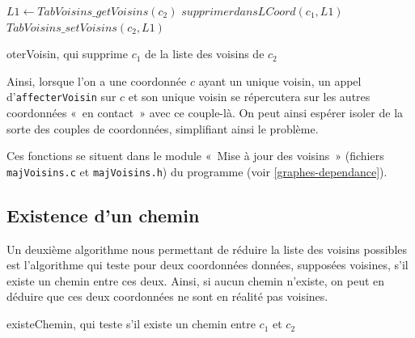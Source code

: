\begin{algorithm}
$L1 \gets TabVoisins\_getVoisins(c_2) $ \;
$supprimerdansLCoord(c_1,L1)$ \;
$TabVoisins\_setVoisins(c_2,L1)$ \;
\caption{oterVoisin, qui supprime $c_1$ de la liste des voisins de $c_2$}
\end{algorithm}

Ainsi, lorsque l'on a une coordonnée $c$ ayant un unique voisin, un appel d'\verb$affecterVoisin$ sur $c$ et son unique voisin se répercutera sur les autres coordonnées «~en contact~» avec ce couple-là. On peut ainsi espérer isoler de la sorte des couples de coordonnées, simplifiant ainsi le problème.

Ces fonctions se situent dans le module «~Mise à jour des voisins~» (fichiers \verb$majVoisins.c$ et \verb$majVoisins.h$) du programme (voir \ref{graphes-dependance}).

\subsection{Existence d'un chemin}

Un deuxième algorithme nous permettant de réduire la liste des voisins possibles est l'algorithme qui teste pour deux coordonnées données, supposées voisines, s'il existe un chemin entre ces deux. Ainsi, si aucun chemin n'existe, on peut en déduire que ces deux coordonnées ne sont en réalité pas voisines.

\begin{algorithm}[H]
  \caption{existeChemin, qui teste s'il existe un chemin entre $c_1$ et $c_2$}
\end{algorithm}

